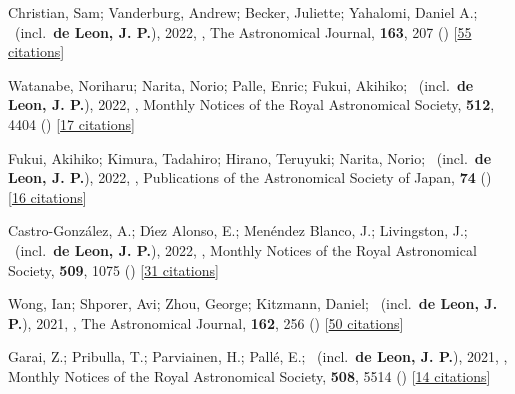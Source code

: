 \item[{\color{numcolor}\scriptsize45}] Christian, Sam; Vanderburg, Andrew; Becker, Juliette; Yahalomi, Daniel A.; \etal\ (incl.\ \textbf{de Leon, J. P.}), 2022, , The Astronomical Journal, \textbf{163}, 207 () [\href{https://ui.adsabs.harvard.edu/abs/2022AJ....163..207C}{55 citations}]

\item[{\color{numcolor}\scriptsize44}] Watanabe, Noriharu; Narita, Norio; Palle, Enric; Fukui, Akihiko; \etal\ (incl.\ \textbf{de Leon, J. P.}), 2022, , Monthly Notices of the Royal Astronomical Society, \textbf{512}, 4404 () [\href{https://ui.adsabs.harvard.edu/abs/2022MNRAS.512.4404W}{17 citations}]

\item[{\color{numcolor}\scriptsize43}] Fukui, Akihiko; Kimura, Tadahiro; Hirano, Teruyuki; Narita, Norio; \etal\ (incl.\ \textbf{de Leon, J. P.}), 2022, , Publications of the Astronomical Society of Japan, \textbf{74} () [\href{https://ui.adsabs.harvard.edu/abs/2022PASJ...74L...1F}{16 citations}]

\item[{\color{numcolor}\scriptsize42}] Castro-Gonz{\'a}lez, A.; D{\'\i}ez Alonso, E.; Men{\'e}ndez Blanco, J.; Livingston, J.; \etal\ (incl.\ \textbf{de Leon, J. P.}), 2022, , Monthly Notices of the Royal Astronomical Society, \textbf{509}, 1075 () [\href{https://ui.adsabs.harvard.edu/abs/2022MNRAS.509.1075C}{31 citations}]

\item[{\color{numcolor}\scriptsize41}] Wong, Ian; Shporer, Avi; Zhou, George; Kitzmann, Daniel; \etal\ (incl.\ \textbf{de Leon, J. P.}), 2021, , The Astronomical Journal, \textbf{162}, 256 () [\href{https://ui.adsabs.harvard.edu/abs/2021AJ....162..256W}{50 citations}]

\item[{\color{numcolor}\scriptsize40}] Garai, Z.; Pribulla, T.; Parviainen, H.; Pall{\'e}, E.; \etal\ (incl.\ \textbf{de Leon, J. P.}), 2021, , Monthly Notices of the Royal Astronomical Society, \textbf{508}, 5514 () [\href{https://ui.adsabs.harvard.edu/abs/2021MNRAS.508.5514G}{14 citations}]

